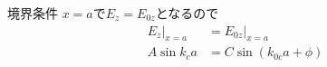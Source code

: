 \documentclass[a4paper,10pt]{bxjsarticle}
\begin{document}
境界条件 $x=a$で$ E_z = E_{0z} $となるので
\begin{align*}
    E_z |_{x=a} &= E_{0z} |_{x=a} \\
    A \sin k_c a &= C \sin (k_{0c} a + \phi) \\
\end{align*}



  
\end{document}
